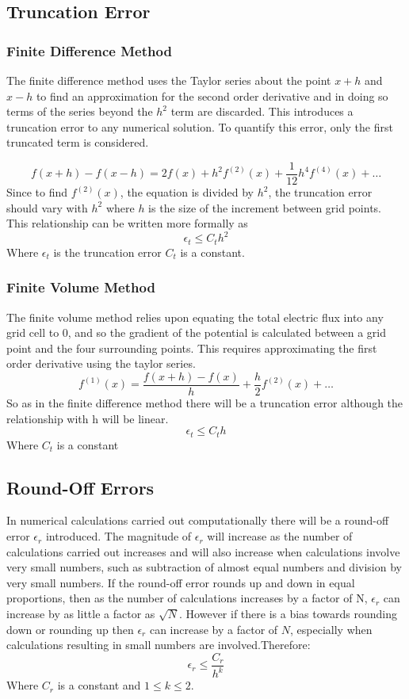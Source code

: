 \documentclass[aps,twocolumn,pre,nofootinbib,10pt]{revtex4-1}
\begin{document}
\subsection{Truncation Error}

\subsubsection{Finite Difference Method}

The finite difference method uses the Taylor series about the point \(x+h\) and \(x-h\) to find an approximation for the second order derivative and in doing so terms of the series beyond the \(h^2\) term are discarded. This introduces a truncation error to any numerical solution. To quantify this error, only the first truncated term is considered. 

\[f(x+h)-f(x-h) = 2f(x) + h^2f^{(2)}(x) + \frac{1}{12}h^4f^{(4)}(x) + \dots \]
Since to find \(f^{(2)}(x) \), the equation is divided by \(h^2\), the truncation error should vary with \(h^2\) where \(h\) is the size of the increment between grid points. This relationship can be written more formally as
\[\epsilon_{t} \leq C_th^2 \]
Where \(\epsilon_{t}\) is the truncation error \(C_t\) is a constant.



\subsubsection{Finite Volume Method}

The finite volume method relies upon equating the total electric flux into any grid cell to 0, and so the gradient of the potential is calculated between a grid point and the four surrounding points. This requires approximating the first order derivative using the taylor series.
\[f^{(1)}(x) = \frac{f(x+h) - f(x)}{h} + \frac{h}{2}f^{(2)}(x) + \dots\]
So as in the finite difference method there will be a truncation error although the relationship with h will be linear.
\[\epsilon_t \leq C_th \]
Where \(C_t\) is a constant



\subsection{Round-Off Errors}

In numerical calculations carried out computationally there will be a round-off error \(\epsilon_r\) introduced. The magnitude of \(\epsilon_r\) will increase as the number of calculations carried out increases and will also increase when calculations involve very small numbers, such as subtraction of almost equal numbers and division by very small numbers. If the round-off error rounds up and down in equal proportions, then as the number of calculations increases by a factor of N, \(\epsilon_r\) can increase by as little a factor as \(\sqrt{N}.\) However if there is a bias towards rounding down or rounding up then \(\epsilon_r\) can increase by a factor of \(N\), especially when calculations resulting in small numbers are involved.Therefore: 
\[\epsilon_r \leq \frac{C_r}{h^k} \]\cite[p.~29]{recipes_c}
Where \(C_r\) is a constant and \(1 \leq k \leq 2\).
\end{document}

